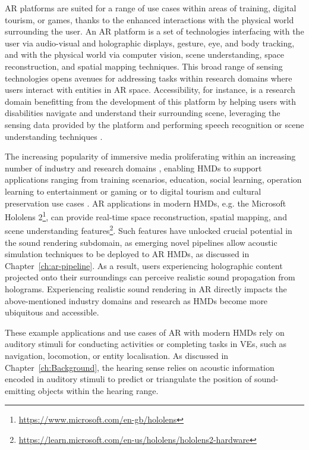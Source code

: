 AR platforms are suited for a range of use cases within areas of training, digital tourism, or games, thanks to the enhanced interactions with the physical world surrounding the user. An AR platform is a set of technologies interfacing with the user via audio-visual and holographic displays, gesture, eye, and body tracking, and with the physical world via computer vision, scene understanding, space reconstruction, and spatial mapping techniques. This broad range of sensing technologies opens avenues for addressing tasks within research domains where users interact with entities in AR space. Accessibility, for instance, is a research domain benefitting from the development of this platform by helping users with disabilities navigate and understand their surrounding scene, leveraging the sensing data provided by the platform and performing speech recognition or scene understanding techniques \citep{mehra2020potential}.


The increasing popularity of immersive media proliferating within an increasing number of industry and research domains \citep{park2022metaverse}, enabling HMDs to support applications ranging from training scenarios, education, social learning, operation learning \citep{harris2020effect, ahir2020application} to entertainment or gaming \citep{yuen2011augmented, ke2018virtual} or to digital tourism and cultural preservation use cases \citep{schofield2018viking, selmanovic2020cultural}. AR applications in modern HMDs, e.g. the Microsoft Hololens 2\footnote{\url{https://www.microsoft.com/en-gb/hololens}\label{note:ms-hl2}}, can provide real-time space reconstruction, spatial mapping, and scene understanding features\footnote{\url{https://learn.microsoft.com/en-us/hololens/hololens2-hardware}\label{note:ms-hl2-hw}}. Such features have unlocked crucial potential in the sound rendering subdomain, as emerging novel pipelines allow acoustic simulation techniques to be deployed to AR HMDs, as discussed in Chapter~\ref{ch:ar-pipeline}. As a result, users experiencing holographic content projected onto their surroundings can perceive realistic sound propagation from holograms. Experiencing realistic sound rendering in AR directly impacts the above-mentioned industry domains and research as HMDs become more ubiquitous and accessible. \par
These example applications and use cases of AR with modern HMDs rely on auditory stimuli for conducting activities or completing tasks in VEs, such as navigation, locomotion, or entity localisation. As discussed in Chapter~\ref{ch:Background}, the hearing sense relies on acoustic information encoded in auditory stimuli to predict or triangulate the position of sound-emitting objects within the hearing range.


